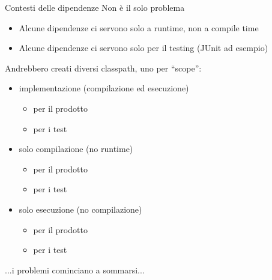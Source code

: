 \documentclass[presentation]{beamer}
\begin{document}
\begin{frame}[fragile]{Contesti delle dipendenze}
    Non è il solo problema
    \begin{itemize}
        \item Alcune dipendenze ci servono solo a runtime, non a compile time
        \item Alcune dipendenze ci servono solo per il testing (JUnit ad esempio)
    \end{itemize}
    Andrebbero creati diversi classpath, uno per ``scope'':
    \begin{itemize}
        \item implementazione (compilazione ed esecuzione)
        \begin{itemize}
            \item per il prodotto
            \item per i test
        \end{itemize}
        \item solo compilazione (no runtime)
        \begin{itemize}
            \item per il prodotto
            \item per i test
        \end{itemize}
        \item solo esecuzione (no compilazione)
        \begin{itemize}
            \item per il prodotto
            \item per i test
        \end{itemize}
    \end{itemize}
    ...i problemi cominciano a sommarsi...
\end{frame}
\end{document}
